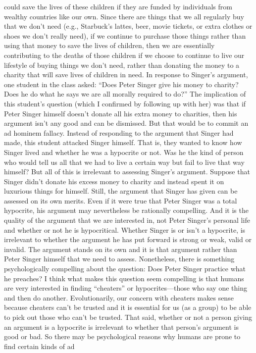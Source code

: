could save the lives of these children if they are funded by individuals
from wealthy countries like our own. Since there are things that we all
regularly buy that we don't need (e.g., Starbuck's lattes, beer, movie
tickets, or extra clothes or shoes we don't really need), if we continue to
purchase those things rather than using that money to save the lives of
children, then we are essentially contributing to the deaths of those
children if we choose to continue to live our lifestyle of buying things we
don't need, rather than donating the money to a charity that will save
lives of children in need. In response to Singer's argument, one student
in the class asked: ``Does Peter Singer give his money to charity? Does
he do what he says we are all morally required to do?''
The implication of this student's question (which I confirmed by following up
with her) was that if Peter Singer himself doesn't donate all his extra money to
charities, then his argument isn't any good and can be dismissed. But that
would be to commit an ad hominem fallacy. Instead of responding to the
argument that Singer had made, this student attacked Singer himself. That is,
they wanted to know how Singer lived and whether he was a hypocrite or not.
Was he the kind of person who would tell us all that we had to live a certain way
but fail to live that way himself? But all of this is irrelevant to assessing Singer's
argument. Suppose that Singer didn't donate his excess money to charity and
instead spent it on luxurious things for himself. Still, the argument that Singer
has given can be assessed on its own merits. Even if it were true that Peter
Singer was a total hypocrite, his argument may nevertheless be rationally
compelling. And it is the quality of the argument that we are interested in, not
Peter Singer's personal life and whether or not he is hypocritical. Whether
Singer is or isn't a hypocrite, is irrelevant to whether the argument he has put
forward is strong or weak, valid or invalid. The argument stands on its own and
it is that argument rather than Peter Singer himself that we need to assess.
Nonetheless, there is something psychologically compelling about the question:
Does Peter Singer practice what he preaches? I think what makes this question
seem compelling is that humans are very interested in finding ``cheaters'' or
hypocrites---those who say one thing and then do another. Evolutionarily, our
concern with cheaters makes sense because cheaters can't be trusted and it is
essential for us (as a group) to be able to pick out those who can't be trusted.
That said, whether or not a person giving an argument is a hypocrite is irrelevant
to whether that person's argument is good or bad. So there may be
psychological reasons why humans are prone to find certain kinds of ad

